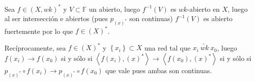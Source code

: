 \documentclass[11pt]{article}
\newcommand{\dual}[1]{\left(#1\right)^{\ast}}
\newcommand{\ip}[1]{\left\langle#1\right\rangle}
\newcommand{\sett}[1]{\left\lbrace#1\right\rbrace}
\numberwithin{theorem}{subsection}
\newenvironment{proof}[1][Demostraci\'on]{\begin{trivlist}
		\item[\hskip \labelsep {\bfseries #1}]}{\end{trivlist}}
\newcommand{\qed}{\nobreak \ifvmode \relax \else
	\ifdim\lastskip<1.5em \hskip-\lastskip
	\hskip1.5em plus0em minus0.5em \fi \nobreak
	\vrule height0.75em width0.5em depth0.25em\fi}
\begin{document}
\begin{proof}
	Sea $f \in \dual{X,wk}$ y $V \subset \mathbb{F}$ un abierto, luego $f^{-1}(V)$ es $wk$-abierto en $X$, luego al ser intersecci\'on e abiertos (pues $p_{\dual{x}}$ son continuas) $f^{-1}(V)$ es abierto fuertemente por lo que $f \in \dual{X}$.
	
	Rec\'iprocamente, sea $f \in \dual{X}$ y $\sett{x_i} \subset X$ una red tal que $x_i \ \underrightarrow{wk} \ x_0$, luego $f(x_i) \rightarrow f(x_0)$ si y s\'olo si $\ip{f(x_i),\dual{x}} \rightarrow \ip{f(x_0), \dual{x}}$ si y s\'olo si $p_{\dual{x}} \circ f(x_i) \rightarrow p_{\dual{x}} \circ f (x_0)$ que vale pues ambas son continuas. \qed
	
\end{proof}
\end{document}
